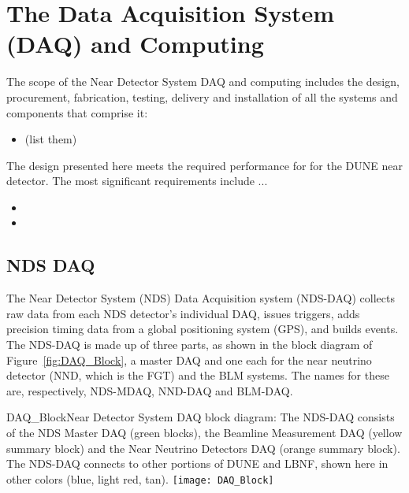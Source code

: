 \section{The Data Acquisition System (DAQ) and Computing}
\label{cdrsec:detectors-nd-ref-daq-comp}

The scope of the Near Detector System DAQ and computing includes the design, procurement, fabrication, testing, delivery and installation of all the systems and components that comprise it: 

\begin{itemize}
\item (list them)
\end{itemize}

The design presented here meets the required performance for  for the DUNE near detector. The most significant requirements include ...

\begin{itemize}
\item
\item
\end{itemize}


\subsection{NDS DAQ}
\label{cdrsec:nd-gdaq-intro}

The Near Detector System (NDS) Data Acquisition system (NDS-DAQ) collects raw data from each NDS 
detector's individual DAQ, issues triggers, adds precision timing 
data from a global positioning system (GPS), and builds events. 
The NDS-DAQ is made up of three parts, as shown in the block diagram of 
Figure~\ref{fig:DAQ_Block}, a master DAQ and one each for the near neutrino detector (NND, which is the FGT) and the BLM systems. The names for these are, respectively, NDS-MDAQ, NND-DAQ and BLM-DAQ.

\begin{cdrfigure}{DAQ_Block}{Near Detector System DAQ block diagram: The NDS-DAQ consists 
of the NDS Master DAQ (green blocks), the Beamline Measurement DAQ (yellow summary 
block) and the Near Neutrino Detectors DAQ (orange summary block).  The 
NDS-DAQ connects to other portions of DUNE and LBNF, shown here in other colors (blue, 
light red, tan).}
\texttt{[image: DAQ\_Block]}
\end{cdrfigure}

